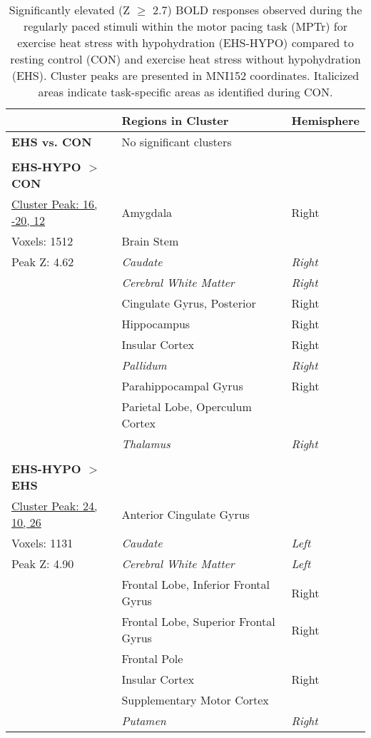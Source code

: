 \begin{table}
	\caption{Significantly elevated (Z ${\ge}$ 2.7) BOLD responses observed during the regularly paced stimuli within the motor pacing task (MPTr) for exercise heat stress with hypohydration (EHS-HYPO) compared to resting control (CON) and exercise heat stress without hypohydration (EHS). Cluster peaks are presented in MNI152 coordinates. Italicized areas indicate task-specific areas as identified during CON.}
	\centering
	\begin{tabular}{lll} 
		\hline
		& Regions in Cluster & Hemisphere \\
		\hline
		\textbf{EHS vs. CON} & No significant clusters & \\
		&& \\
		\textbf{EHS-HYPO ${>}$ CON} && \\
		\underline{Cluster Peak: 16, -20, 12} & Amygdala & Right  \\
		Voxels: 1512 & Brain Stem & \\
		Peak Z: 4.62 & \textit{Caudate} & \textit{Right} \\
		& \textit{Cerebral White Matter} & \textit{Right} \\
		& Cingulate Gyrus, Posterior & Right \\
		& Hippocampus & Right \\
		& Insular Cortex & Right \\
		& \textit{Pallidum} & \textit{Right} \\
		& Parahippocampal Gyrus & Right \\
		& Parietal Lobe, Operculum Cortex \\
		& \textit{Thalamus} & \textit{Right} \\
		&& \\
		\textbf{EHS-HYPO ${>}$ EHS} & & \\	
		\underline{Cluster Peak: 24, 10, 26} & Anterior Cingulate Gyrus & \\
		Voxels: 1131 & \textit{Caudate} & \textit{Left} \\
		Peak Z: 4.90 & \textit{Cerebral White Matter} & \textit{Left} \\
		& Frontal Lobe, Inferior Frontal Gyrus & Right \\
		& Frontal Lobe, Superior Frontal Gyrus & Right \\ 
		& Frontal Pole & \\
		& Insular Cortex & Right \\
		& Supplementary Motor Cortex & \\
		& \textit{Putamen} & \textit{Right} \\
		\hline		    
	\end{tabular}
	\label{tbl:mpt_reg_tbl}
\end{table}

